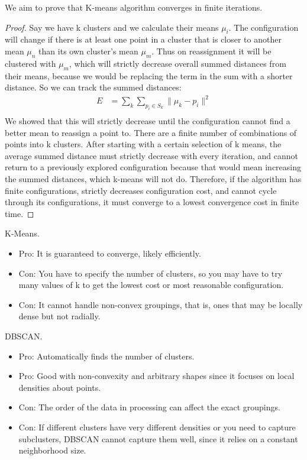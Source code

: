 \documentclass[newpage]{homework}
\begin{document}
We aim to prove that K-means algorithm converges in finite iterations.
\begin{proof}
    Say we have k clusters and we calculate their means $\mu_i$. The configuration will change if there is at least one point in a cluster that is closer to another mean $\mu_n$ than its own cluster's mean $\mu_m$. Thus on reassignment it will be clustered with $\mu_m$, which will strictly decrease overall summed distances from their means, because we would be replacing the term in the sum with a shorter distance. So we can track the summed distances:
    \begin{align*}
        E	&=	\sum_{k} \sum_{p_i \in S_k} \lVert \mu_k - p_i \rVert^2	\\
    \end{align*}
    We showed that this will strictly decrease until the configuration cannot find a better mean to reassign  a point to. There are a finite number of combinations of points into k clusters. After starting with a certain selection of k means, the average summed distance must strictly decrease with every iteration, and cannot return to a previously explored configuration because that would mean increasing the summed distances, which k-means will not do. Therefore, if the algorithm has finite configurations, strictly decreases configuration cost, and cannot cycle through its configurations, it must converge to a lowest convergence cost in finite time.
\end{proof}


\question
K-Means.
\begin{itemize}
    \item Pro: It is guaranteed to converge, likely efficiently.
    \item Con: You have to specify the number of clusters, so you may have to try many values of k to get the lowest cost or most reasonable configuration.
    \item Con: It cannot handle non-convex groupings, that is, ones that may be locally dense but not radially.
\end{itemize}

DBSCAN.
\begin{itemize}
    \item Pro: Automatically finds the number of clusters.
    \item Pro: Good with non-convexity and arbitrary shapes since it focuses on local densities about points.
    \item Con: The order of the data in processing can affect the exact groupings.
    \item Con: If different clusters have very different densities or you need to capture subclusters, DBSCAN cannot capture them well, since it relies on a constant neighborhood size.
\end{itemize}
\end{document}
